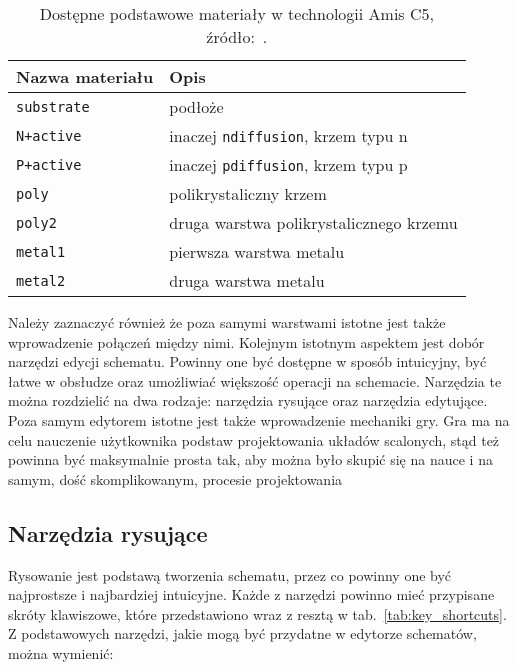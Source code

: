 \newpage
\begin{table}[h]
    \centering
    \caption[Dostępne materiały w technologii Amis C5.]
    {Dostępne podstawowe materiały w technologii Amis C5, źródło:~\cite{amis_params}.}
    \label{tab:amis_materials}
    \begin{tabular}{|l|l|}
        \hline
        Nazwa materiału & Opis \\
        \hline
        \hline
        \texttt{substrate} & podłoże \\
        \hline
        \texttt{N+active} & inaczej \texttt{ndiffusion}, krzem typu n\\
        \hline
        \texttt{P+active} & inaczej \texttt{pdiffusion}, krzem typu p\\
        \hline
        \texttt{poly} & polikrystaliczny krzem \\
        \hline
        \texttt{poly2} & druga warstwa polikrystalicznego krzemu \\
        \hline
        \texttt{metal1} & pierwsza warstwa metalu \\
        \hline
        \texttt{metal2} & druga warstwa metalu \\
        \hline
    \end{tabular}
\end{table}

Należy zaznaczyć również że poza samymi warstwami istotne jest także wprowadzenie połączeń między nimi.
\indent Kolejnym istotnym aspektem jest dobór narzędzi edycji schematu.
Powinny one być dostępne w sposób intuicyjny, być łatwe w obsłudze oraz umożliwiać większość operacji na schemacie.
Narzędzia te można rozdzielić na dwa rodzaje: narzędzia rysujące oraz narzędzia edytujące. \\
\indent Poza samym edytorem istotne jest także wprowadzenie mechaniki gry.
Gra ma na celu nauczenie użytkownika podstaw projektowania układów scalonych,
stąd też powinna być maksymalnie prosta tak, aby można było skupić się na nauce i na samym,
dość skomplikowanym, procesie projektowania

\subsection{Narzędzia rysujące}
\label{subsec:narzedzia_rysujace}

Rysowanie jest podstawą tworzenia schematu, przez co powinny one być najprostsze i najbardziej intuicyjne.
Każde z narzędzi powinno mieć przypisane skróty klawiszowe,
które przedstawiono wraz z resztą w tab.~\ref{tab:key_shortcuts}. %
Z podstawowych narzędzi, jakie mogą być przydatne w edytorze schematów, można wymienić:

